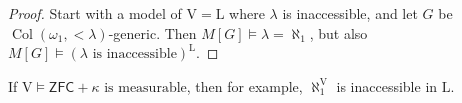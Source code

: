 \begin{proof}
    Start with a model of \( \mathrm{V} = \mathrm{L} \) where \( \lambda \) is inaccessible, and let \( G \) be \( \operatorname{Col}(\omega_1, <\lambda) \)-generic.
    Then \( M[G] \vDash \lambda = \aleph_1 \), but also \( M[G] \vDash (\lambda \text{ is inaccessible})^{\mathrm{L}} \).
\end{proof}
\begin{remark}
    If \( \mathrm{V} \vDash \mathsf{ZFC} + \kappa \text{ is measurable} \), then for example, \( \aleph_1^{\mathrm{V}} \) is inaccessible in \( \mathrm{L} \).
\end{remark}

